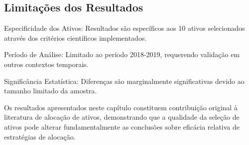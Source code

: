 \subsection{Limitações dos Resultados}

Especificidade dos Ativos: Resultados são específicos aos 10 ativos selecionados através dos critérios científicos implementados.

Período de Análise: Limitado ao período 2018-2019, requerendo validação em outros contextos temporais.

Significância Estatística: Diferenças são marginalmente significativas devido ao tamanho limitado da amostra.

Os resultados apresentados neste capítulo constituem contribuição original à literatura de alocação de ativos, demonstrando que a qualidade da seleção de ativos pode alterar fundamentalmente as conclusões sobre eficácia relativa de estratégias de alocação.